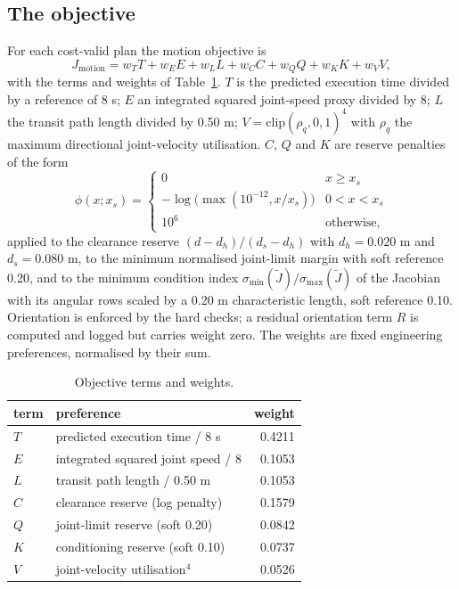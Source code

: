 \documentclass[conference]{IEEEtran}
\begin{document}
\subsection{The objective}\label{sec:cost}
For each cost-valid plan the motion objective is
\begin{equation}
J_{\mathrm{motion}} = w_T T + w_E E + w_L L + w_C C + w_Q Q + w_K K + w_V V ,
\end{equation}
with the terms and weights of Table~\ref{tab:terms}. $T$ is the predicted execution time divided by a reference of 8 s; $E$ an integrated squared joint-speed proxy divided by 8; $L$ the transit path length divided by 0.50 m; $V = \mathrm{clip}(\rho_q, 0, 1)^4$ with $\rho_q$ the maximum directional joint-velocity utilisation. $C$, $Q$ and $K$ are reserve penalties of the form
\begin{equation}
\phi(x; x_s) = \begin{cases} 0 & x \ge x_s\\ -\log\!\big(\max(10^{-12}, x/x_s)\big) & 0 < x < x_s\\ 10^6 & \text{otherwise,}\end{cases}
\end{equation}
applied to the clearance reserve $(d - d_h)/(d_s - d_h)$ with $d_h = 0.020$ m and $d_s = 0.080$ m, to the minimum normalised joint-limit margin with soft reference 0.20, and to the minimum condition index $\sigma_{\min}(\tilde J)/\sigma_{\max}(\tilde J)$ of the Jacobian with its angular rows scaled by a 0.20 m characteristic length, soft reference 0.10. Orientation is enforced by the hard checks; a residual orientation term $R$ is computed and logged but carries weight zero. The weights are fixed engineering preferences, normalised by their sum.

\begin{table}[t]\caption{Objective terms and weights.}\label{tab:terms}\centering\small
\begin{tabular}{llr}\toprule
term & preference & weight\\\midrule
$T$ & predicted execution time / 8 s & 0.4211\\
$E$ & integrated squared joint speed / 8 & 0.1053\\
$L$ & transit path length / 0.50 m & 0.1053\\
$C$ & clearance reserve (log penalty) & 0.1579\\
$Q$ & joint-limit reserve (soft 0.20) & 0.0842\\
$K$ & conditioning reserve (soft 0.10) & 0.0737\\
$V$ & joint-velocity utilisation$^4$ & 0.0526\\\bottomrule
\end{tabular}\end{table}
\end{document}
